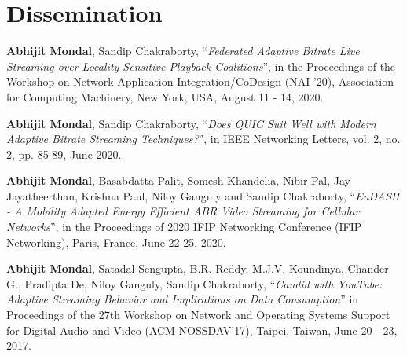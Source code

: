 \chapter*{Dissemination}
\vspace*{0.5cm}
\renewcommand{\chaptermark}[1]{\markboth{}{\sffamily #1}}
\chaptermark{Dissemination}
\begin{enumerate}[start=1,label={[\arabic*]}]
	\item \textbf{Abhijit Mondal}, Sandip Chakraborty, ``\textit{Federated Adaptive Bitrate Live Streaming over Locality Sensitive Playback Coalitions}”, in the Proceedings of the Workshop on Network Application Integration/CoDesign (NAI '20), Association for Computing Machinery, New York, USA, August 11 - 14, 2020. 
	\item \textbf{Abhijit Mondal}, Sandip Chakraborty, ``\textit{Does QUIC Suit Well with Modern Adaptive Bitrate Streaming Techniques?}”, in IEEE Networking Letters, vol. 2, no. 2, pp. 85-89, June 2020.
	\item \textbf{Abhijit Mondal}, Basabdatta Palit, Somesh Khandelia, Nibir Pal, Jay Jayatheerthan, Krishna Paul, Niloy Ganguly and Sandip Chakraborty, ``\textit{EnDASH - A Mobility Adapted Energy Efficient ABR Video Streaming for Cellular Networks}'', in the Proceedings of 2020 IFIP Networking Conference (IFIP Networking), Paris, France, June 22-25, 2020.
	\item \textbf{Abhijit Mondal}, Satadal Sengupta, B.R. Reddy, M.J.V. Koundinya, Chander G., Pradipta De, Niloy Ganguly, Sandip Chakraborty, ``\textit{Candid with YouTube: Adaptive Streaming Behavior and Implications on Data Consumption}'' in Proceedings of the 27th Workshop on Network and Operating Systems Support for Digital Audio and Video (ACM NOSSDAV’17), Taipei, Taiwan, June 20 - 23, 2017.
\end{enumerate}
%
%
%
%




